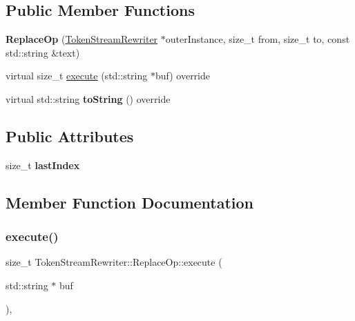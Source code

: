 \subsection*{Public Member Functions}
\begin{DoxyCompactItemize}
\item 
\mbox{\label{classantlr4_1_1TokenStreamRewriter_1_1ReplaceOp_a729c01e3c0f0d5464d8e834f706c3284}} 
{\bfseries Replace\+Op} (\hyperlink{classantlr4_1_1TokenStreamRewriter}{Token\+Stream\+Rewriter} $\ast$outer\+Instance, size\+\_\+t from, size\+\_\+t to, const std\+::string \&text)
\item 
virtual size\+\_\+t \hyperlink{classantlr4_1_1TokenStreamRewriter_1_1ReplaceOp_af530710355bab587a6ff70f889e3eec3}{execute} (std\+::string $\ast$buf) override
\item 
\mbox{\label{classantlr4_1_1TokenStreamRewriter_1_1ReplaceOp_afcbc1f377ddc52a928157a29f2537610}} 
virtual std\+::string {\bfseries to\+String} () override
\end{DoxyCompactItemize}
\subsection*{Public Attributes}
\begin{DoxyCompactItemize}
\item 
\mbox{\label{classantlr4_1_1TokenStreamRewriter_1_1ReplaceOp_aaabfef476e3ef2c72541eef1d028a9d4}} 
size\+\_\+t {\bfseries last\+Index}
\end{DoxyCompactItemize}


\subsection{Member Function Documentation}
\mbox{\label{classantlr4_1_1TokenStreamRewriter_1_1ReplaceOp_af530710355bab587a6ff70f889e3eec3}} 
\subsubsection{\texorpdfstring{execute()}{execute()}}
{\footnotesize\ttfamily size\+\_\+t Token\+Stream\+Rewriter\+::\+Replace\+Op\+::execute (\begin{DoxyParamCaption}\item[{std\+::string $\ast$}]{buf }\end{DoxyParamCaption})\hspace{0.3cm}{\ttfamily [override]}, {\ttfamily [virtual]}}


